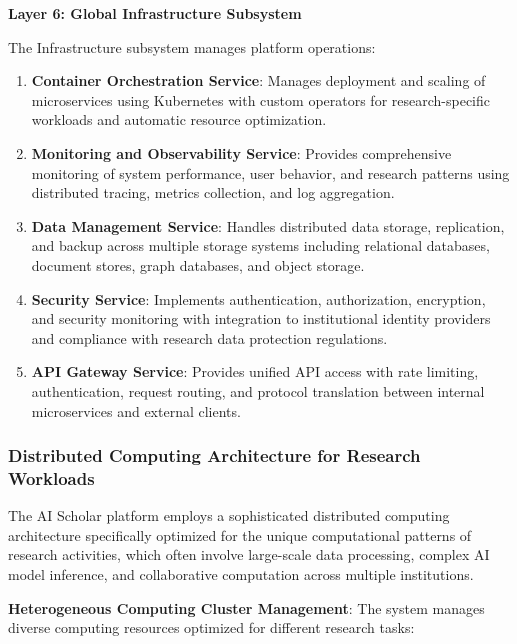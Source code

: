 \documentclass[10pt,twocolumn]{article}
\begin{document}
\textbf{Layer 6: Global Infrastructure Subsystem}

The Infrastructure subsystem manages platform operations:

\begin{enumerate}
    \item \textbf{Container Orchestration Service}: Manages deployment and scaling of microservices using Kubernetes with custom operators for research-specific workloads and automatic resource optimization.
    
    \item \textbf{Monitoring and Observability Service}: Provides comprehensive monitoring of system performance, user behavior, and research patterns using distributed tracing, metrics collection, and log aggregation.
    
    \item \textbf{Data Management Service}: Handles distributed data storage, replication, and backup across multiple storage systems including relational databases, document stores, graph databases, and object storage.
    
    \item \textbf{Security Service}: Implements authentication, authorization, encryption, and security monitoring with integration to institutional identity providers and compliance with research data protection regulations.
    
    \item \textbf{API Gateway Service}: Provides unified API access with rate limiting, authentication, request routing, and protocol translation between internal microservices and external clients.
\end{enumerate}

\subsubsection{Distributed Computing Architecture for Research Workloads}

The AI Scholar platform employs a sophisticated distributed computing architecture specifically optimized for the unique computational patterns of research activities, which often involve large-scale data processing, complex AI model inference, and collaborative computation across multiple institutions.

\textbf{Heterogeneous Computing Cluster Management}: The system manages diverse computing resources optimized for different research tasks:
\end{document}
